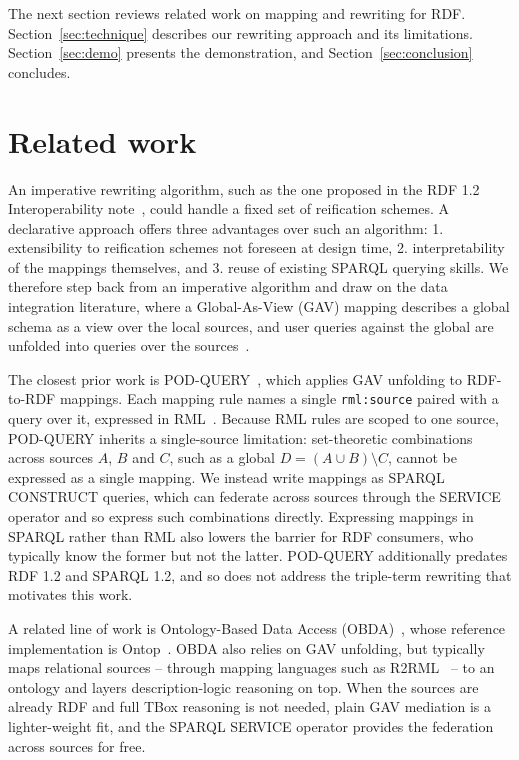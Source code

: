\documentclass[
]{ceurart}
\begin{document}
The next section reviews related work on mapping and rewriting for
RDF. Section~\ref{sec:technique} describes our rewriting approach and
its limitations. Section~\ref{sec:demo} presents the demonstration,
and Section~\ref{sec:conclusion} concludes.

\section{Related work}
\label{sec:related-work}

An imperative rewriting algorithm, such as the one proposed in the RDF
1.2 Interoperability note~\cite{spec:rdf-1-2-interop}, could handle a
fixed set of reification schemes. A declarative approach offers three
advantages over such an algorithm: 1. extensibility to reification
schemes not foreseen at design time, 2. interpretability of the
mappings themselves, and 3. reuse of existing SPARQL querying skills.
We therefore step back from an imperative algorithm and draw on the
data integration literature, where a Global-As-View (GAV) mapping
describes a global schema as a view over the local sources, and user
queries against the global are unfolded into queries over the
sources~\cite{lenzerini2002data}.

The closest prior work is POD-QUERY~\cite{pod-query}, which applies
GAV unfolding to RDF-to-RDF mappings. Each mapping rule names a single
\texttt{rml:source} paired with a query over it, expressed in
RML~\cite{rml}. Because RML rules are scoped to one source, POD-QUERY
inherits a single-source limitation: set-theoretic combinations across
sources $A$, $B$ and $C$, such as a global $D = (A \cup B) \setminus
C$, cannot be expressed as a single mapping. We instead write mappings
as SPARQL CONSTRUCT queries, which can federate across sources through
the SERVICE operator and so express such combinations directly.
Expressing mappings in SPARQL rather than RML also lowers the barrier
for RDF consumers, who typically know the former but not the latter.
POD-QUERY additionally predates RDF 1.2 and SPARQL 1.2, and so does
not address the triple-term rewriting that motivates this work.

A related line of work is Ontology-Based Data Access
(OBDA)~\cite{obda, obda-survey}, whose reference implementation is
Ontop~\cite{ontop}. OBDA also relies on GAV unfolding, but typically
maps relational sources -- through mapping languages such as
R2RML~\cite{spec:r2rml} -- to an ontology and layers
description-logic reasoning on top. When the sources are already RDF
and full TBox reasoning is not needed, plain GAV mediation is a
lighter-weight fit, and the SPARQL SERVICE operator provides the
federation across sources for free.
\end{document}
